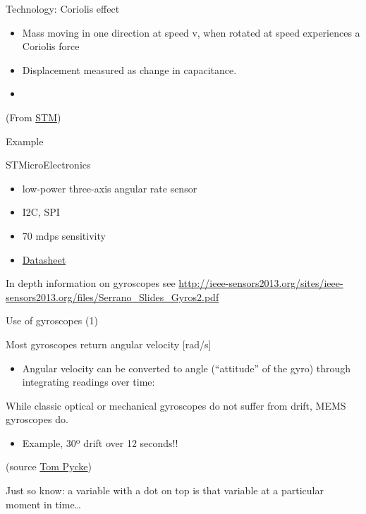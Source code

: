 \documentclass[compress]{beamer}
\begin{document}
\begin{frame}{Technology: Coriolis effect}

\begin{itemize}

\item
  Mass moving in one direction at speed v, when rotated at speed
  experiences a Coriolis force
\item
  Displacement measured as change in capacitance.
\end{itemize}

\begin{itemize}

\item
  ~
\end{itemize}

(From
\href{http://electroiq.com/blog/2010/11/introduction-to-mems-gyroscopes/}{STM})

\end{frame}

\begin{frame}{Example}

STMicroElectronics

\begin{itemize}

\item
  low-power three-axis angular rate sensor
\item
  I2C, SPI
\item
  70 mdps sensitivity
\item
  \href{http://www.st.com/web/en/resource/technical/document/datasheet/CD00265057.pdf}{Datasheet}
\end{itemize}

In depth information on gyroscopes see
\url{http://ieee-sensors2013.org/sites/ieee-sensors2013.org/files/Serrano_Slides_Gyros2.pdf}

\end{frame}

\begin{frame}{Use of gyroscopes (1)}

Most gyroscopes return angular velocity {[}rad/s{]}

\begin{itemize}

\item
  Angular velocity can be converted to angle (``attitude'' of the gyro)
  through integrating readings over time:
\end{itemize}

While classic optical or mechanical gyroscopes do not suffer from drift,
MEMS gyroscopes do.

\begin{itemize}

\item
  Example, 30º drift over 12 seconds!!
\end{itemize}

(source
\href{http://tom.pycke.be/mav/70/gyroscope-to-roll-pitch-and-yaw}{Tom
Pycke})

Just so know: a variable with a dot on top is that variable at a
particular moment in time\ldots{}

\end{frame}
\end{document}
